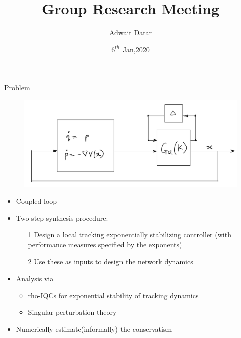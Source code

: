 \documentclass{beamer}
\title[Spectral Graph Theory Applications]{Group Research Meeting}
\author{Adwait Datar}
\institute{Technical University of Hamburg}
\date{$6^{th}$ Jan,2020}
\begin{document}
\begin{frame}	
  \titlepage
\end{frame}


\begin{frame}{Problem}	
\begin{figure}
	\includegraphics[width=1.0\linewidth]{figures/coupled_arch.JPG}
	\label{fig:mjlstraj}
\end{figure}
\begin{itemize}
	\item Coupled loop
	\item Two step-synthesis procedure:
	\begin{itemize}
		\item[1] Design a local tracking exponentially stabilizing controller (with performance measures specified by the exponents)
		\item[2] Use these as inputs to design the network dynamics
	\end{itemize}
	\item Analysis via
	\begin{itemize}
		\item rho-IQCs for exponential stability of tracking dynamics
		\item Singular perturbation theory
	\end{itemize}
	\item Numerically estimate(informally) the conservatism
\end{itemize}
\end{frame}
\end{document}
